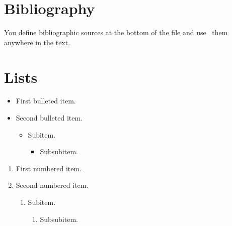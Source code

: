 \documentclass[10pt]{article}
\begin{document}
\section{Bibliography}

You define bibliographic sources at the bottom of the file and
use~\cite{lamport94} them anywhere in the text.

\section{Lists}

\begin{itemize}

\item First bulleted item.

\item Second bulleted item.

    \begin{itemize}

    \item Subitem.

        \begin{itemize}

        \item Subsubitem.

        \end{itemize}

    \end{itemize}

\end{itemize}


\begin{enumerate}

\item First numbered item.

\item Second numbered item.

    \begin{enumerate}

    \item Subitem.

        \begin{enumerate}

        \item Subsubitem.

        \end{enumerate}

    \end{enumerate}

\end{enumerate}
\end{document}
